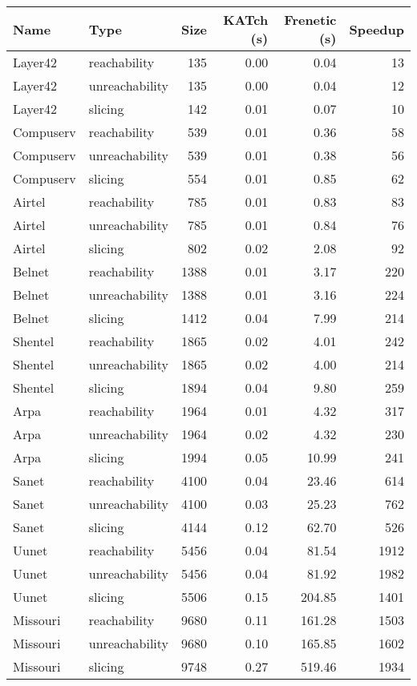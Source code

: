 \begin{tabular}{llrrrr}
\toprule
Name & Type & Size & KATch (s) & Frenetic (s) & Speedup \\
\midrule
Layer42 & reachability & 135 & 0.00 & 0.04 & 13 \\
Layer42 & unreachability & 135 & 0.00 & 0.04 & 12 \\
Layer42 & slicing & 142 & 0.01 & 0.07 & 10 \\
Compuserv & reachability & 539 & 0.01 & 0.36 & 58 \\
Compuserv & unreachability & 539 & 0.01 & 0.38 & 56 \\
Compuserv & slicing & 554 & 0.01 & 0.85 & 62 \\
Airtel & reachability & 785 & 0.01 & 0.83 & 83 \\
Airtel & unreachability & 785 & 0.01 & 0.84 & 76 \\
Airtel & slicing & 802 & 0.02 & 2.08 & 92 \\
Belnet & reachability & 1388 & 0.01 & 3.17 & 220 \\
Belnet & unreachability & 1388 & 0.01 & 3.16 & 224 \\
Belnet & slicing & 1412 & 0.04 & 7.99 & 214 \\
Shentel & reachability & 1865 & 0.02 & 4.01 & 242 \\
Shentel & unreachability & 1865 & 0.02 & 4.00 & 214 \\
Shentel & slicing & 1894 & 0.04 & 9.80 & 259 \\
Arpa & reachability & 1964 & 0.01 & 4.32 & 317 \\
Arpa & unreachability & 1964 & 0.02 & 4.32 & 230 \\
Arpa & slicing & 1994 & 0.05 & 10.99 & 241 \\
Sanet & reachability & 4100 & 0.04 & 23.46 & 614 \\
Sanet & unreachability & 4100 & 0.03 & 25.23 & 762 \\
Sanet & slicing & 4144 & 0.12 & 62.70 & 526 \\
Uunet & reachability & 5456 & 0.04 & 81.54 & 1912 \\
Uunet & unreachability & 5456 & 0.04 & 81.92 & 1982 \\
Uunet & slicing & 5506 & 0.15 & 204.85 & 1401 \\
Missouri & reachability & 9680 & 0.11 & 161.28 & 1503 \\
Missouri & unreachability & 9680 & 0.10 & 165.85 & 1602 \\
Missouri & slicing & 9748 & 0.27 & 519.46 & 1934 \\

\end{tabular}
